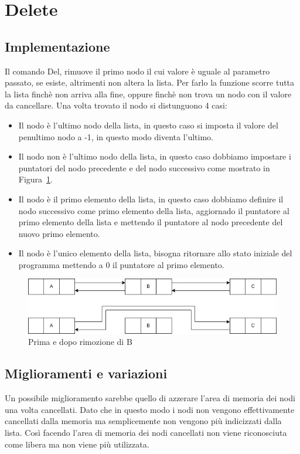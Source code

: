 \section{Delete}

\subsection{Implementazione}
Il comando Del, rimuove il primo nodo il cui valore è uguale al parametro passato,
se esiste, altrimenti non altera la lista. Per farlo la funzione scorre tutta la
 lista finchè non arriva alla fine, oppure finchè non trova
un nodo con il valore da cancellare. Una volta trovato il nodo si distunguono 4 casi:
\begin{itemize}
    \item Il nodo è l'ultimo nodo della lista, in questo caso si imposta il valore 
    del penultimo nodo a -1, in questo modo diventa l'ultimo.
    \item Il nodo non è l'ultimo nodo della lista, in questo caso dobbiamo impostare 
    i puntatori del nodo precedente e del nodo successivo come mostrato in Figura~\ref{fig:delmiddle}.
    \item Il nodo è il primo elemento della lista, in questo caso dobbiamo definire il nodo 
    successivo come primo elemento della lista, aggiornado il puntatore al primo elemento 
    della lista e mettendo il puntatore al nodo precedente del nuovo primo elemento.
    \item Il nodo è l'unico elemento della lista, bisogna ritornare allo stato iniziale 
    del programma mettendo a 0 il puntatore al primo elemento.
\end{itemize}

\begin{figure}[h]
    \centering
    \includegraphics[scale=0.4]{diagrams/del-middle.png}
    \caption{Prima e dopo rimozione di B}
    \label{fig:delmiddle}
\end{figure}

\subsection{Miglioramenti e variazioni}
Un possibile miglioramento sarebbe quello di azzerare l'area di memoria dei nodi una
volta cancellati. Dato che in questo modo i nodi non vengono effettivamente cancellati 
dalla memoria ma semplicemente non vengono più indicizzati dalla lista. Così facendo 
l'area di memoria dei nodi cancellati non viene riconosciuta come libera ma non viene 
più utilizzata.